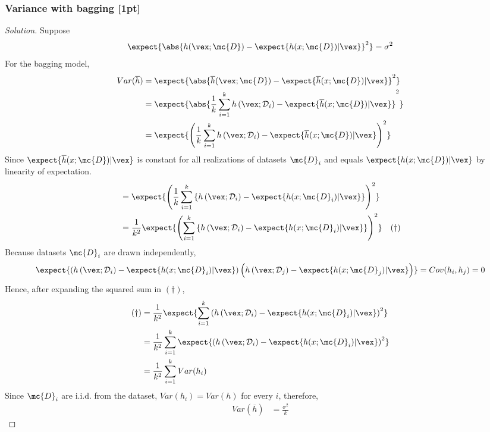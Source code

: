\documentclass{article}
\begin{document}
	\subsubsection{Variance with bagging [1pt]}
	\begin{proof}[Solution]
		Suppose 
		\begin{align}
			\expect{
				\abs{
					h(\vex; \mc{D})
					- \expect{h(x; \mc{D})|\vex}
				}^2
			} = \sigma^2
		\end{align}
		For the bagging model, 
		\begin{align}
			Var(\overline{h}) &= 
			\expect{
				\abs{
					\overline{h}(\vex; \mc{D})
					- \expect{\overline{h}(x; \mc{D})|\vex}
				}^2
			} \\
			&= 
			\expect{
				\abs{
				\frac{1}{k}
				\sum_{i=1}^{k}
				h\left(\vex ; \mathcal{D}_{i}\right)
					- \expect{\overline{h}(x; \mc{D})|\vex}
				}^2
			}\\
			&= \expect{
				\left(
				\frac{1}{k}
				\sum_{i=1}^{k}
				h\left(\vex ; \mathcal{D}_{i}\right)
					- \expect{\overline{h}(x; \mc{D})|\vex}
				\right)^2
			}
		\end{align}
		Since $\expect{\overline{h}(x; \mc{D})|\vex}$ is constant for all realizations of datasets $\mc{D}_i$ and equals $\expect{h(x; \mc{D})|\vex}$ by linearity of expectation.
		\begin{align}
			&= \expect{
				\left(
				\frac{1}{k}
				\sum_{i=1}^{k}
				\left\{h\left(\vex ; \mathcal{D}_{i}\right)
					- \expect{h(x; \mc{D}_i)|\vex}
				\right\}
				\right)^2
			} \\
			&= \frac{1}{k^2} \expect{
				\left(
				\sum_{i=1}^{k}
				\left\{h\left(\vex ; \mathcal{D}_{i}\right)
					- \expect{h(x; \mc{D}_i)|\vex}
				\right\}
				\right)^2
			}\quad (\dagger)
		\end{align}
		Because datasets $\mc{D}_i$ are drawn independently, 
		\begin{align}
			\expect{
				\left(h\left(\vex ; \mathcal{D}_{i}\right)
					- \expect{h(x; \mc{D}_i)|\vex}
				\right)
				\left(h\left(\vex ; \mathcal{D}_{j}\right)
					- \expect{h(x; \mc{D}_j)|\vex}
				\right)
			} = Cov(h_i, h_j) = 0
		\end{align}
		Hence, after expanding the squared sum in $(\dagger)$,
		\begin{align}
			(\dagger) &= \frac{1}{k^2} \expect{
				\sum_{i=1}^{k}
				\left(
				h\left(\vex ; \mathcal{D}_{i}\right)
					- \expect{h(x; \mc{D}_i)|\vex}
				\right)^2
			} \\
			&= \frac{1}{k^2} \sum_{i=1}^{k}
			\expect{
				\left(
				h\left(\vex ; \mathcal{D}_{i}\right)
					- \expect{h(x; \mc{D}_i)|\vex}
				\right)^2
			} \\
			&= \frac{1}{k^2} \sum_{i=1}^k Var(h_i)
		\end{align}
		Since $\mc{D}_i$ are i.i.d. from the dataset, $Var(h_i) = Var(h)$ for every $i$, therefore,
		\begin{align}
			Var(\overline{h}) &= \frac{\sigma^2}{k}
		\end{align}
	\end{proof}
	
\end{document}
